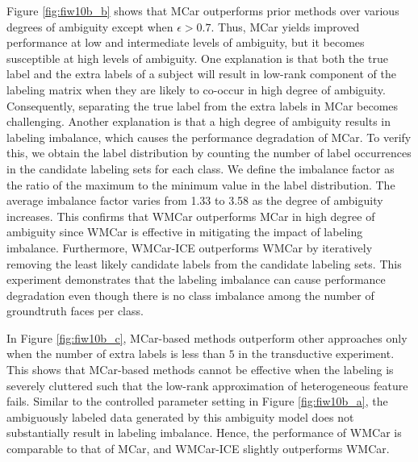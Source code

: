 \documentclass[10pt,journal,compsoc]{IEEEtran}
\begin{document}
Figure \ref{fig:fiw10b_b} shows that MCar outperforms prior methods over various degrees of ambiguity except when $\epsilon > 0.7$. Thus, MCar yields improved performance at low and intermediate levels of ambiguity, but it becomes susceptible at high levels of ambiguity.
One explanation is that both the true label and the extra labels of a subject will result in low-rank component of the labeling matrix when they are likely to co-occur in high degree of ambiguity. Consequently, separating the true label from the extra labels in MCar becomes challenging. Another explanation is that a high degree of ambiguity results in labeling imbalance, which causes the performance degradation of MCar. To verify this, we obtain the label distribution by counting the number of label occurrences in the candidate labeling sets for each class. We define the imbalance factor as the ratio of the maximum to the minimum value in the label distribution. The average imbalance factor varies from 1.33 to 3.58 as the degree of ambiguity increases. This confirms that WMCar outperforms MCar in high degree of ambiguity since WMCar is effective in mitigating the impact of labeling imbalance. Furthermore, WMCar-ICE outperforms WMCar by iteratively removing the least likely candidate labels from the candidate labeling sets. This experiment demonstrates that the labeling imbalance can cause performance degradation even though there is no class imbalance among the number of groundtruth faces per class.


In Figure \ref{fig:fiw10b_c}, MCar-based methods outperform other approaches only when the number of extra labels is less than $5$ in the transductive experiment. This shows that MCar-based methods cannot be effective when the labeling is severely cluttered such that the low-rank approximation of heterogeneous feature fails. Similar to the controlled parameter setting in Figure \ref{fig:fiw10b_a}, the ambiguously labeled data generated by this ambiguity model does not substantially result in labeling imbalance. Hence, the performance of WMCar is comparable to that of MCar, and WMCar-ICE slightly outperforms WMCar.
\end{document}
